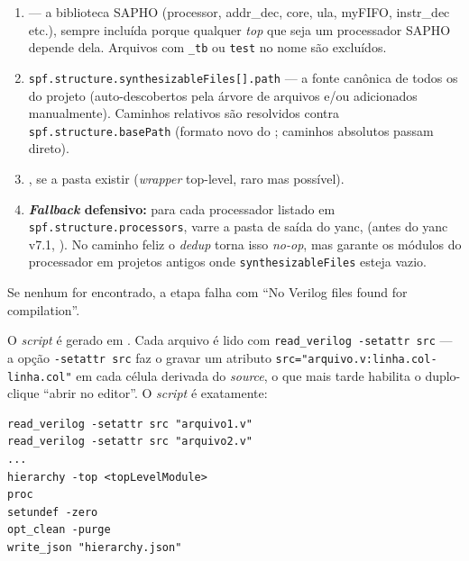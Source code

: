 \begin{enumerate}[leftmargin=2.2em]
  \item {} --- a biblioteca SAPHO (processor, addr\_dec,
        core, ula, myFIFO, instr\_dec etc.), sempre incluída porque qualquer
        \emph{top} que seja um processador SAPHO depende dela. Arquivos com
        \lstinline|_tb| ou \lstinline|test| no nome são excluídos.
  \item \lstinline|spf.structure.synthesizableFiles[].path| --- a fonte canônica
        de todos os  do projeto (auto-descobertos pela árvore de
        arquivos e/ou adicionados manualmente). Caminhos relativos são resolvidos
        contra \lstinline|spf.structure.basePath| (formato novo do ;
        caminhos absolutos passam direto).
  \item {}, se a pasta existir (\emph{wrapper}
        top-level, raro mas possível).
  \item \textbf{\emph{Fallback} defensivo:} para cada processador listado em
        \lstinline|spf.structure.processors|, varre
        a pasta de saída do yanc,  (antes do
        yanc v7.1, ). No caminho feliz o \emph{dedup}
        torna isso \emph{no-op}, mas garante os módulos do processador em
        projetos antigos onde \lstinline|synthesizableFiles| esteja vazio.
\end{enumerate}

Se nenhum  for encontrado, a etapa falha com \enquote{No Verilog files
found for compilation}.

O \emph{script}  é gerado em . Cada
arquivo é lido com \lstinline|read_verilog -setattr src| --- a opção
\lstinline|-setattr src| faz o  gravar um atributo
\lstinline|src="arquivo.v:linha.col-linha.col"| em cada célula derivada do
\emph{source}, o que mais tarde habilita o duplo-clique \enquote{abrir no
editor}. O \emph{script} é exatamente:

\begin{lstlisting}[caption={Script Yosys do esquemático (gerado em main/ipc/prism.js)}]
read_verilog -setattr src "arquivo1.v"
read_verilog -setattr src "arquivo2.v"
...
hierarchy -top <topLevelModule>
proc
setundef -zero
opt_clean -purge
write_json "hierarchy.json"
\end{lstlisting}

